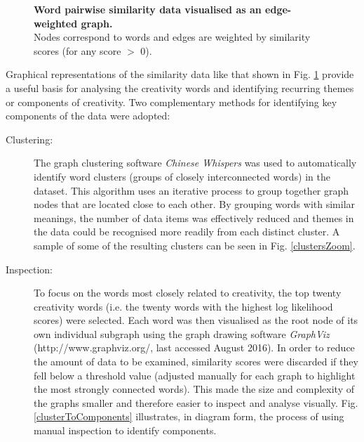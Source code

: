 \documentclass[10pt,letterpaper]{article}
\begin{document}
\begin{figure}
\caption{{\bf Word pairwise similarity data visualised as an edge-weighted graph.} \\Nodes  correspond to words and edges are weighted by similarity scores (for any score $>$ 0). }
\label{conceptIdea}
\end{figure} 


Graphical representations of the similarity data like that shown in Fig. \ref{conceptIdea} provide a useful basis for analysing the creativity words and identifying recurring themes or components of creativity. Two complementary methods for identifying key components of the data were adopted:






\begin{description}

\item[Clustering:] The graph clustering software {\em Chinese Whispers} \cite{biemann06} was used to automatically identify word clusters (groups of closely interconnected words) in the dataset. This algorithm uses an iterative process to group together graph nodes that are located close to each other. By grouping words with similar meanings, the number of data items was effectively reduced and themes in the data could be recognised more readily from each distinct cluster. A sample of some of the resulting clusters can be seen in Fig. \ref{clustersZoom}. %

\item[Inspection:] To focus on the words most closely related to creativity, the top twenty creativity words (i.e. the twenty  words with the highest log likelihood scores) were selected. Each word was then visualised as the root node of its own individual subgraph using the graph drawing software {\em GraphViz} (http://www.graphviz.org/, last accessed August 2016). In order to reduce the amount of data to be examined, similarity scores were discarded if they fell below a threshold value (adjusted manually for each graph to highlight the most strongly connected words). This made the size and complexity of the graphs smaller and therefore easier to inspect and analyse visually. Fig. \ref{clusterToComponents} illustrates, in diagram form, the process of using manual inspection to identify components. 

\end{description}
\end{document}
